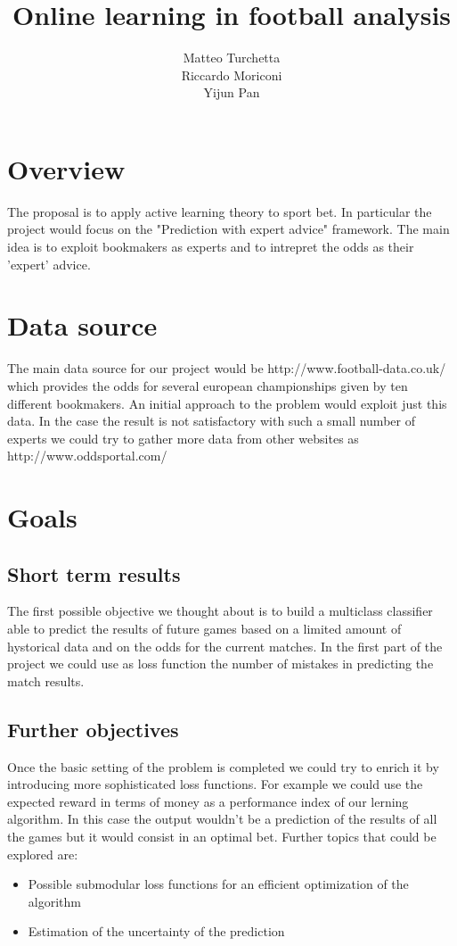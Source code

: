 \documentclass[4paper, 12pt]{article}
\title{Online learning in football analysis}
\author{Matteo Turchetta\\Riccardo Moriconi\\Yijun Pan}
\begin{document}
\maketitle

\section{Overview}
The proposal is to apply active learning theory to sport bet. In particular the project would focus on the "Prediction with expert advice" framework. The main idea is to exploit bookmakers as experts and to intrepret the odds as their 'expert' advice.
\section{Data source}
The main data source for our project would be  http://www.football-data.co.uk/ which provides the odds for several european championships given by ten different bookmakers. An initial approach to the problem would exploit just this data. In the case the result is not satisfactory with such a small number of experts we could try to gather more data from other websites as http://www.oddsportal.com/
\section{Goals}
\subsection{Short term results}
The first possible objective we thought about is to build a multiclass classifier able to predict the results of future games based on a limited amount of hystorical data and on the odds for the current matches. In the first part of the project we could use as loss function the number of mistakes in predicting the match results.
\subsection{Further objectives}
Once the basic setting of the problem is completed we could try to enrich it by introducing more sophisticated loss functions. For example we could use the expected reward in terms of money as a performance index of our lerning algorithm. In this case the output wouldn't be a prediction of the results of all the games but it would consist in an optimal bet. Further topics that could be explored are:
\begin{itemize}
\item Possible submodular loss functions for an efficient optimization of the algorithm
\item Estimation of the uncertainty of the prediction
\end{itemize}
\end{document}
